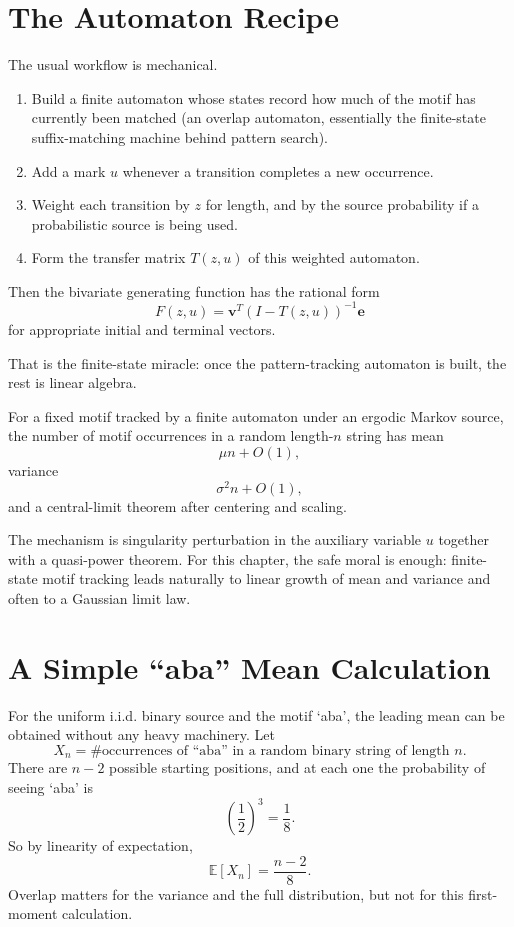 \section{The Automaton Recipe}

The usual workflow is mechanical.

\begin{enumerate}
  \item Build a finite automaton whose states record how much of the motif has currently been matched (an overlap automaton, essentially the finite-state suffix-matching machine behind pattern search).
  \item Add a mark $u$ whenever a transition completes a new occurrence.
  \item Weight each transition by $z$ for length, and by the source probability if a probabilistic source is being used.
  \item Form the transfer matrix $T(z,u)$ of this weighted automaton.
\end{enumerate}

Then the bivariate generating function has the rational form
\[
  F(z,u) = \mathbf{v}^T (I-T(z,u))^{-1} \mathbf{e}
\]
for appropriate initial and terminal vectors.

That is the finite-state miracle: once the pattern-tracking automaton is built, the rest is linear algebra.

\begin{theorem}
For a fixed motif tracked by a finite automaton under an ergodic Markov source, the number of motif occurrences in a random length-$n$ string has mean
\[
  \mu n + O(1),
\]
variance
\[
  \sigma^2 n + O(1),
\]
and a central-limit theorem after centering and scaling.
\end{theorem}

The mechanism is singularity perturbation in the auxiliary variable $u$ together with a quasi-power theorem. For this chapter, the safe moral is enough: finite-state motif tracking leads naturally to linear growth of mean and variance and often to a Gaussian limit law.

\section{A Simple ``aba'' Mean Calculation}

For the uniform i.i.d. binary source and the motif `aba', the leading mean can be obtained without any heavy machinery. Let
\[
  X_n = \#\text{occurrences of ``aba'' in a random binary string of length }n.
\]
There are $n-2$ possible starting positions, and at each one the probability of seeing `aba' is
\[
  \left(\frac12\right)^3 = \frac18.
\]
So by linearity of expectation,
\[
  \mathbb E[X_n] = \frac{n-2}{8}.
\]
Overlap matters for the variance and the full distribution, but not for this first-moment calculation.

